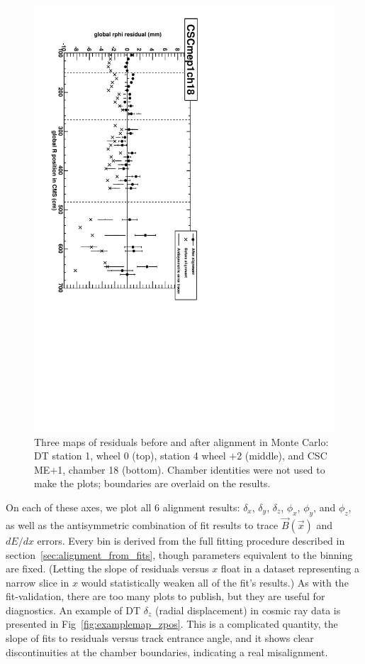 \documentclass[12pt]{article}
\begin{document}
\begin{figure}
\hspace{0.5 cm} \includegraphics[height=0.8\linewidth, angle=90]{examplemap_CSCrphi1.pdf}

\caption{Three maps of residuals before and after alignment in Monte Carlo: DT station 1, wheel 0 (top), station 4 wheel $+$2 (middle), and CSC ME$+$1, chamber 18 (bottom).  Chamber identities were not used to make the plots; boundaries are overlaid on the results. \label{fig:examplemap_rphi}}
\end{figure}

On each of these axes, we plot all 6 alignment results: $\delta_x$,
$\delta_y$, $\delta_z$, $\phi_x$, $\phi_y$, and $\phi_z$, as well as
the antisymmetric combination of fit results to trace
$\vec{B}(\vec{x})$ and $dE/dx$ errors.  Every bin is derived from the
full fitting procedure described in
section~\ref{sec:alignment_from_fits}, though parameters equivalent to
the binning are fixed.  (Letting the slope of residuals versus $x$
float in a dataset representing a narrow slice in $x$ would
statistically weaken all of the fit's results.)  As with the
fit-validation, there are too many plots to publish, but they are
useful for diagnostics.  An example of DT $\delta_z$ (radial
displacement) in cosmic ray data is presented in
Fig~\ref{fig:examplemap_zpos}.  This is a complicated quantity, the
slope of fits to residuals versus track entrance angle, and it shows
clear discontinuities at the chamber boundaries, indicating a real
misalignment.
\end{document}

